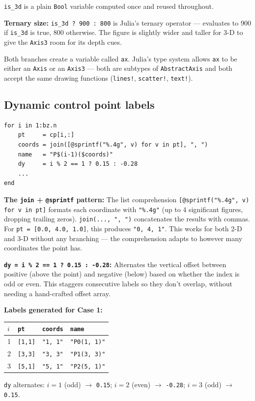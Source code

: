 \documentclass[12pt, a4paper]{article}
\newcommand{\cd}[1]{\texttt{#1}}
\begin{document}
\cd{is\_3d} is a plain \cd{Bool} variable computed once
and reused throughout.

\textbf{Ternary size:}
\cd{is\_3d ? 900 : 800} is Julia's ternary operator
--- evaluates to 900 if \cd{is\_3d} is true, 800 otherwise.
The figure is slightly wider and taller for 3-D to give
the \cd{Axis3} room for its depth cues.

Both branches create a variable called \cd{ax}.
Julia's type system allows \cd{ax} to be either an
\cd{Axis} or an \cd{Axis3} --- both are subtypes of
\cd{AbstractAxis} and both accept the same drawing
functions (\cd{lines!}, \cd{scatter!}, \cd{text!}).

\subsection{Dynamic control point labels}

\begin{verbatim}
for i in 1:bz.n
    pt     = cp[i,:]
    coords = join([@sprintf("%.4g", v) for v in pt], ", ")
    name   = "P$(i-1)($coords)"
    dy     = i % 2 == 1 ? 0.15 : -0.28
    ...
end
\end{verbatim}

\textbf{The \cd{join} + \cd{@sprintf} pattern:}
The list comprehension \cd{[@sprintf("\%.4g", v) for v in pt]}
formats each coordinate with \cd{"\%.4g"} (up to 4
significant figures, dropping trailing zeros).
\cd{join(..., ", ")} concatenates the results with
commas.
For \cd{pt = [0.0, 4.0, 1.0]}, this produces
\cd{"0, 4, 1"}.
This works for both 2-D and 3-D without any branching
--- the comprehension adapts to however many coordinates
the point has.

\textbf{\cd{dy = i \% 2 == 1 ? 0.15 : -0.28}:}
Alternates the vertical offset between positive
(above the point) and negative (below) based on
whether the index is odd or even.
This staggers consecutive labels so they don't
overlap, without needing a hand-crafted offset array.

\begin{examplebox}
\textbf{Labels generated for Case 1:}

\medskip
\begin{tabular}{llll}
\toprule
$i$ & \cd{pt} & \cd{coords} & \cd{name} \\
\midrule
1 & \cd{[1,1]} & \cd{"1, 1"} & \cd{"P0(1, 1)"} \\
2 & \cd{[3,3]} & \cd{"3, 3"} & \cd{"P1(3, 3)"} \\
3 & \cd{[5,1]} & \cd{"5, 1"} & \cd{"P2(5, 1)"} \\
\bottomrule
\end{tabular}

\cd{dy} alternates: $i=1$ (odd) $\to$ \cd{0.15};
$i=2$ (even) $\to$ \cd{-0.28};
$i=3$ (odd) $\to$ \cd{0.15}.
\end{examplebox}
\end{document}
